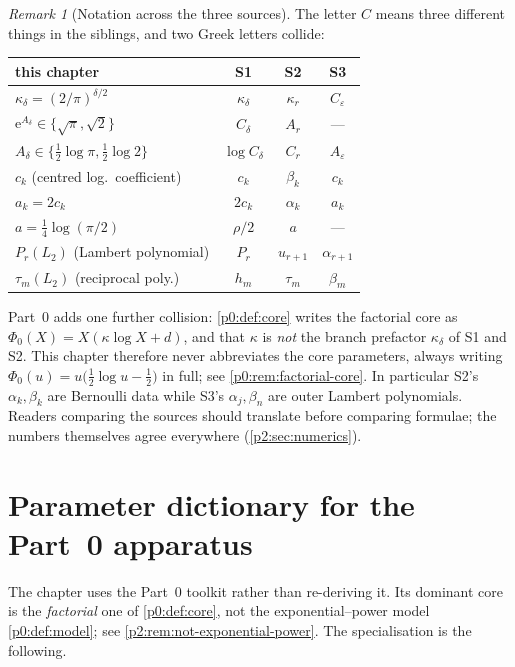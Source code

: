 \documentclass[11pt,a4paper,oneside]{book}
\theoremstyle{plain}
\theoremstyle{definition}
\theoremstyle{remark}
\newtheorem{remark}[theorem]{Remark}
\newcommand{\e}{\mathrm{e}}
\begin{document}
\begin{remark}[Notation across the three sources]
\label{p2:rem:notation-clash}
The letter \(C\) means three different things in the siblings, and two Greek
letters collide:
\begin{center}
\small
\begin{tabular}{lccc}
\toprule
this chapter & \textsf{S1} & \textsf{S2} & \textsf{S3}\\
\midrule
\(\kappa_\delta=(2/\pi)^{\delta/2}\) & \(\kappa_\delta\) & \(\kappa_r\) & \(C_\varepsilon\)\\
\(\e^{A_\delta}\in\{\sqrt\pi,\sqrt2\}\) & \(C_\delta\) & \(A_r\) & ---\\
\(A_\delta\in\{\tfrac12\log\pi,\tfrac12\log2\}\) & \(\log C_\delta\) & \(C_r\) & \(A_\varepsilon\)\\
\(c_k\) (centred log.\ coefficient) & \(c_k\) & \(\beta_k\) & \(c_k\)\\
\(a_k=2c_k\) & \(2c_k\) & \(\alpha_k\) & \(a_k\)\\
\(a=\tfrac14\log(\pi/2)\) & \(\rho/2\) & \(a\) & ---\\
\(P_r(L_2)\) (Lambert polynomial) & \(P_r\) & \(u_{r+1}\) & \(\alpha_{r+1}\)\\
\(\tau_m(L_2)\) (reciprocal poly.) & \(h_m\) & \(\tau_m\) & \(\beta_m\)\\
\bottomrule
\end{tabular}
\end{center}
Part~0 adds one further collision: \cref{p0:def:core} writes the factorial
core as \(\Phi_0(X)=X(\kappa\log X+d)\), and that \(\kappa\) is \emph{not} the
branch prefactor \(\kappa_\delta\) of \textsf{S1} and \textsf{S2}.  This chapter
therefore never abbreviates the core parameters, always writing
\(\Phi_0(u)=u\bigl(\tfrac12\log u-\tfrac12\bigr)\) in full; see
\cref{p0:rem:factorial-core}.
In particular \textsf{S2}'s \(\alpha_k,\beta_k\) are Bernoulli data while
\textsf{S3}'s \(\alpha_j,\beta_n\) are outer Lambert polynomials.  Readers
comparing the sources should translate before comparing formulae; the numbers
themselves agree everywhere (\cref{p2:sec:numerics}).
\end{remark}

\section{Parameter dictionary for the Part~0 apparatus}
\label{p2:sec:dictionary}

The chapter uses the Part~0 toolkit rather than re-deriving it.  Its dominant
core is the \emph{factorial} one of \cref{p0:def:core}, not the
exponential--power model \cref{p0:def:model}; see
\cref{p2:rem:not-exponential-power}.  The specialisation is the following.
\end{document}
